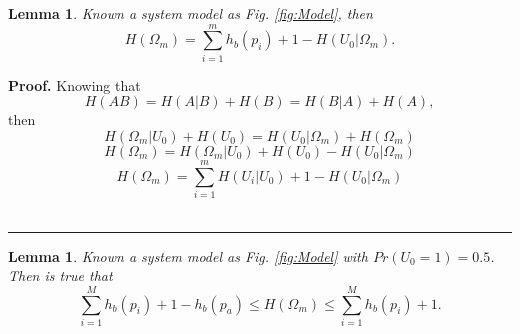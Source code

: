 \documentclass[a4paper,10pt]{article}
\newtheorem{mylemma}[mytheorem]{Lemma}
\newenvironment{myproof}[1][Proof]{\textbf{#1.} }{\ \rule{0.5em}{0.5em}}
\begin{document}
\begin{mdframed}[style=MDFStyGrayScreen]
\begin{mylemma}
 \label{lemm:H}
 Known a system model as Fig. \ref{fig:Model}, then
  \begin{equation}\label{eq:H}
H(\Omega_m) = \sum_{i=1}^{m}{h_{b}(p_i)}+1-H(U_0|\Omega_m).
\end{equation}
\end{mylemma}
\end{mdframed}

\begin{myproof}
 \label{proof:H}
 Knowing that
 \begin{equation}\label{eq:H1}
H(A B)=H(A|B)+H(B)=H(B|A)+H(A),
\end{equation}
then
 \begin{equation}\label{eq:H2}
H(\Omega_m|U_0)+H(U_0)=H(U_0|\Omega_m)+H(\Omega_m)
\end{equation}
 \begin{equation}\label{eq:H3}
H(\Omega_m) = H(\Omega_m|U_0)+H(U_0)-H(U_0|\Omega_m)
\end{equation}
 \begin{equation}\label{eq:H4}
H(\Omega_m) = \sum_{i=1}^{m}{H(U_i|U_0)}+1-H(U_0|\Omega_m)
\end{equation}
\end{myproof}
\begin{mdframed}[style=MDFStyGrayScreen]
\begin{mylemma}
 \label{lemm:Hin}
 Known a system model as Fig. \ref{fig:Model} with $Pr(U_0=1)=0.5$. Then is true that
  \begin{equation}\label{eq:Hin}
\sum_{i=1}^{M}{h_{b}(p_i)}+1-h_{b}(p_a) \leq H(\Omega_m) \leq \sum_{i=1}^{M}{h_{b}(p_i)}+1.
\end{equation}
\end{mylemma}
\end{mdframed}
\end{document}
